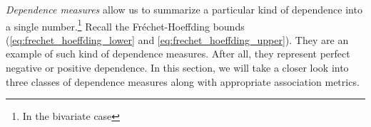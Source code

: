 
\textit{Dependence measures} allow us to summarize a particular kind of dependence into a single number.\footnote{In the bivariate case} Recall the Fr\'echet-Hoeffding bounds (\autoref{eq:frechet_hoeffding_lower} and \autoref{eq:frechet_hoeffding_upper}). They are an example of such kind of dependence measures. After all, they represent perfect negative or positive dependence.
In this section, we will take a closer look into three classes of dependence measures along with appropriate association metrics.


